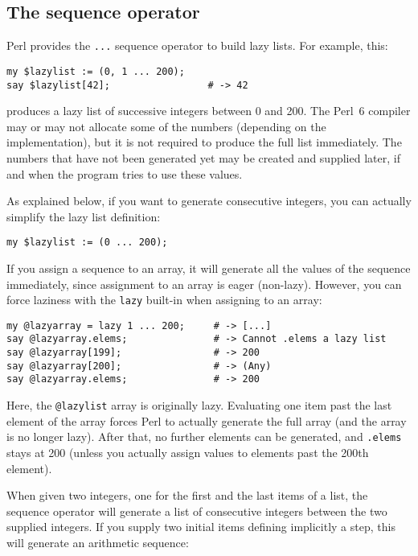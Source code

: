 \subsection{The sequence operator}

Perl provides the \verb'...' sequence operator to build 
lazy lists. For example, this:

\begin{verbatim}
my $lazylist := (0, 1 ... 200);
say $lazylist[42];                 # -> 42
\end{verbatim}

produces a lazy list of successive integers between 0 and 200. 
The Perl~6 compiler may or may not allocate some of the numbers
(depending on the implementation), but it is not required to 
produce the full list immediately. The numbers that have not 
been generated yet may be created and supplied later, if and when 
the program tries to use these values. 

As explained below, if you want to generate consecutive 
integers, you can actually simplify the lazy list definition:

\begin{verbatim}
my $lazylist := (0 ... 200);
\end{verbatim}


If you assign a sequence to an array, it will generate 
all the values of the sequence immediately, since 
assignment to an array is eager (non-lazy).  However, 
you can force laziness with the  {\tt lazy} built-in 
when assigning to an array:

\begin{verbatim}
my @lazyarray = lazy 1 ... 200;     # -> [...]
say @lazyarray.elems;               # -> Cannot .elems a lazy list
say @lazyarray[199];                # -> 200
say @lazyarray[200];                # -> (Any)
say @lazyarray.elems;               # -> 200
\end{verbatim}

Here, the \verb'@lazylist' array is originally lazy. 
Evaluating one item past the last element of the array 
forces Perl to actually generate the full array (and the 
array is no longer lazy). After that, no further elements 
can be generated, and {\tt .elems} stays at 200 (unless 
you actually assign values to elements past the 200th 
element).

When given two integers, one for the first and the last items of 
a list, the sequence operator will generate a list of consecutive 
integers between the two supplied integers. If you supply two 
initial items defining implicitly a step, this will generate 
an arithmetic sequence:


